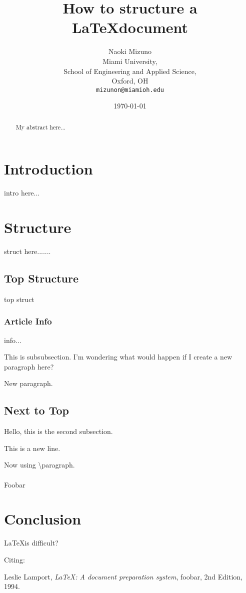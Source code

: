 \documentclass{article}
\begin{document}
\title{How to structure a \LaTeX document}

\author{Naoki Mizuno\\
    Miami University,\\
    School of Engineering and Applied Science,\\
    Oxford, OH\\
\texttt{mizunon@miamioh.edu}}
\date{\today}
\maketitle

\begin{abstract}
    My abstract here...
\end{abstract}

\section{Introduction}

intro here...

\section{Structure}

struct here.......

\subsection{Top Structure}

top struct

\subsubsection{Article Info}

info...

This is subsubsection. I'm wondering what would happen if I create a new
paragraph here?

New paragraph.

\subsection{Next to Top}

Hello, this is the second subsection.

This is a new line.

Now using \textbackslash paragraph.
\paragraph{}
Foobar

\section{Conclusion}
\LaTeX is difficult?

Citing: \cite{lamport94}


\begin{thebibliography}{9}
        Leslie Lamport,
        \emph{\LaTeX: A document preparation system},
        foobar,
        2nd Edition,
        1994.
\end{thebibliography}
\end{document}
